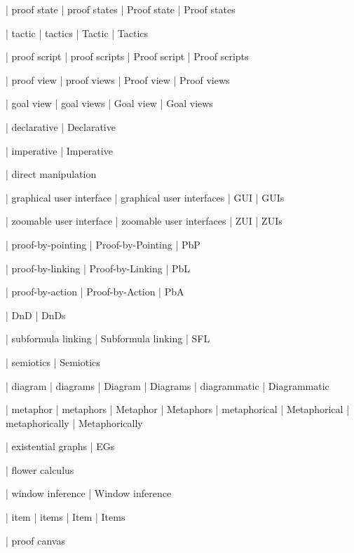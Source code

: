  | proof state
 | proof states
 | Proof state
 | Proof states

 | tactic
 | tactics
 | Tactic
 | Tactics

 | proof script
 | proof scripts
 | Proof script
 | Proof scripts

 | proof view
 | proof views
 | Proof view
 | Proof views

 | goal view
 | goal views
 | Goal view
 | Goal views

 | declarative
 | Declarative

 | imperative
 | Imperative

 | direct manipulation

 | graphical user interface
 | graphical user interfaces
 | GUI
 | GUIs

 | zoomable user interface
 | zoomable user interfaces
 | ZUI
 | ZUIs

 | proof-by-pointing
 | Proof-by-Pointing
 | PbP

 | proof-by-linking
 | Proof-by-Linking
 | PbL

 | proof-by-action
 | Proof-by-Action
 | PbA

 | DnD
 | DnDs

 | subformula linking
 | Subformula linking
 | SFL

 | semiotics
 | Semiotics

 | diagram
 | diagrams
 | Diagram
 | Diagrams
 | diagrammatic
 | Diagrammatic

 | metaphor
 | metaphors
 | Metaphor
 | Metaphors
 | metaphorical
 | Metaphorical
 | metaphorically
 | Metaphorically

 | existential graphs
 | EGs

 | flower calculus
 
 | window inference
 | Window inference


 | item
 | items
 | Item
 | Items

 | proof canvas

